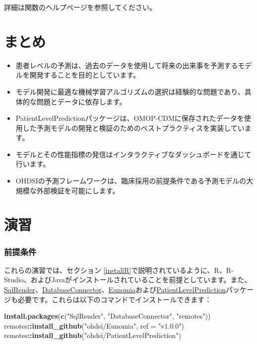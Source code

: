 \documentclass[
  11pt]{book}
\makeatletter
\newenvironment{Shaded}{\begin{snugshade}}{\end{snugshade}}
\newcommand{\AttributeTok}[1]{\textcolor[rgb]{0.13,0.29,0.53}{#1}}
\newcommand{\FunctionTok}[1]{\textcolor[rgb]{0.13,0.29,0.53}{\textbf{#1}}}
\newcommand{\NormalTok}[1]{#1}
\newcommand{\SpecialCharTok}[1]{\textcolor[rgb]{0.81,0.36,0.00}{\textbf{#1}}}
\newcommand{\StringTok}[1]{\textcolor[rgb]{0.31,0.60,0.02}{#1}}
\newenvironment{kframe}{%
\medskip{}
\setlength{\fboxsep}{.8em}
 \def\at@end@of@kframe{}%
 \ifinner\ifhmode%
  \def\at@end@of@kframe{\end{minipage}}%
  \begin{minipage}{\columnwidth}%
 \fi\fi%
 \def\FrameCommand##1{\hskip\@totalleftmargin \hskip-\fboxsep
 \colorbox{myShadeColor}{##1}\hskip-\fboxsep
     \hskip-\linewidth \hskip-\@totalleftmargin \hskip\columnwidth}%
 \MakeFramed {\advance\hsize-\width
   \@totalleftmargin\z@ \linewidth\hsize
   \@setminipage}}%
 {\par\unskip\endMakeFramed%
 \at@end@of@kframe}
\newenvironment{rmdblock}[1]
  {
  \begin{itemize}
  \renewcommand{\labelitemi}{
    \raisebox{-.7\height}[0pt][0pt]{
      {\setkeys{Gin}{width=3em,keepaspectratio}\texttt{[image: images/\#1]}}
    }
  }
  \setlength{\fboxsep}{1em}
  \begin{kframe}
  \item
  }
  {
  \end{kframe}
  \end{itemize}
  }
\newenvironment{rmdsummary}
  {\begin{rmdblock}{summary}}
  {\end{rmdblock}}
\theoremstyle{definition}
\theoremstyle{definition}
\theoremstyle{definition}
\theoremstyle{definition}
\theoremstyle{remark}
\makeatother
\begin{document}
詳細は関数のヘルプページを参照してください。

\section{まとめ}\label{ux307eux3068ux3081-10}

\begin{rmdsummary}
\begin{itemize}
\item
  患者レベルの予測は、過去のデータを使用して将来の出来事を予測するモデルを開発することを目的としています。
\item
  モデル開発に最適な機械学習アルゴリズムの選択は経験的な問題であり、具体的な問題とデータに依存します。
\item
  PatientLevelPredictionパッケージは、OMOP-CDMに保存されたデータを使用した予測モデルの開発と検証のためのベストプラクティスを実装しています。
\item
  モデルとその性能指標の発信はインタラクティブなダッシュボードを通じて行います。
\item
  OHDSIの予測フレームワークは、臨床採用の前提条件である予測モデルの大規模な外部検証を可能にします。
\end{itemize}
\end{rmdsummary}

\section{演習}\label{ux6f14ux7fd2-6}

\subsubsection*{前提条件}\label{ux524dux63d0ux6761ux4ef6-8}

これらの演習では、セクション \ref{installR}で説明されているように、R、R-Studio、およびJavaがインストールされていることを前提としています。また、\href{https://ohdsi.github.io/SqlRender/}{SqlRender}、\href{https://ohdsi.github.io/DatabaseConnector/}{DatabaseConnector}、\href{https://ohdsi.github.io/Eunomia/}{Eunomia}および\href{https://ohdsi.github.io/PatientLevelPrediction/}{PatientLevelPrediction}パッケージも必要です。これらは以下のコマンドでインストールできます：

\begin{Shaded}
\begin{Highlighting}[]
\FunctionTok{install.packages}\NormalTok{(}\FunctionTok{c}\NormalTok{(}\StringTok{"SqlRender"}\NormalTok{, }\StringTok{"DatabaseConnector"}\NormalTok{, }\StringTok{"remotes"}\NormalTok{))}
\NormalTok{remotes}\SpecialCharTok{::}\FunctionTok{install\_github}\NormalTok{(}\StringTok{"ohdsi/Eunomia"}\NormalTok{, }\AttributeTok{ref =} \StringTok{"v1.0.0"}\NormalTok{)}
\NormalTok{remotes}\SpecialCharTok{::}\FunctionTok{install\_github}\NormalTok{(}\StringTok{"ohdsi/PatientLevelPrediction"}\NormalTok{)}
\end{Highlighting}
\end{Shaded}
\end{document}
